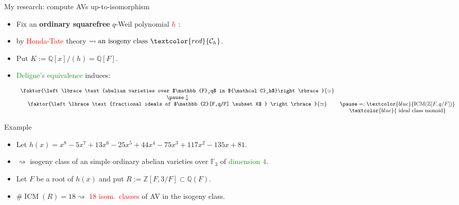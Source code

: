 \documentclass[usenames,dvipsnames]{beamer}
\def\Q{\mathbb{Q}}
\def\Z{\mathbb{Z}}
\def\F{\mathbb{F}}
\DeclareMathOperator{\ICM}{ICM}
\DeclareMathOperator{\Pic}{Pic}
\newcommand{\cC}{{\mathcal C}}
\newcommand{\set}[1]{\left\lbrace#1\right\rbrace }
\newcommand{\red}[1]{\textcolor{red}{#1}}
\newcommand{\blue}[1]{\textcolor{blue}{#1}}
\newcommand{\green}[1]{\textcolor{ForestGreen}{#1}}
\begin{document}
\begin{frame}{My research: compute AVs up-to-isomorphism}
	\begin{itemize}
		\item Fix an \textbf{ordinary squarefree} $q$-Weil polynomial \red{$h$} :
\pause  \item by \red{Honda-Tate} theory $\rightsquigarrow \text{an isogeny class } \red{\cC_h}$.
\pause 	\item Put $K := \Q[x]/(h)=\Q[F]$.

\pause 	\item \green{Deligne's equivalence} induces:
			\begin{theorem}[M.]
			\[\begin{array}{cc}
			\faktor{\set{\text{abelian varieties over $\F_q$ in $\cC_h$}}}{\simeq} & \\
			\pause \updownarrow & \\
			\faktor{\set{ \text{fractional ideals of $\Z[F,q/F] \subset K$ } }}{\simeq} &\pause =:  \blue{\ICM(\Z[F,q/F])}\\ 
			& \blue{\text{ ideal class monoid} }
			  \end{array}\]
			\end{theorem}
	\end{itemize}
\end{frame}

\begin{frame}{ Example}
\begin{itemize}\setlength\itemsep{1em}
 \item Let $h(x)=x^8 - 5x^7 + 13x^6 - 25x^5 + 44x^4 - 75x^3 + 117x^2 - 135x + 81$.
 \pause \item $\rightsquigarrow$ isogeny class of an simple ordinary abelian varieties over $\F_{3}$ of \green{dimension $4$}.
 \pause  \item Let $F$ be a root of $h(x)$ and put $R:=\Z[F,3/F]\subset \Q(F)$.
 \item $\#\ICM(R) = 18 \rightsquigarrow $  \red{$18$ isom.~classes} of AV in the isogeny class.
\end{itemize}
\end{frame}
\end{document}
